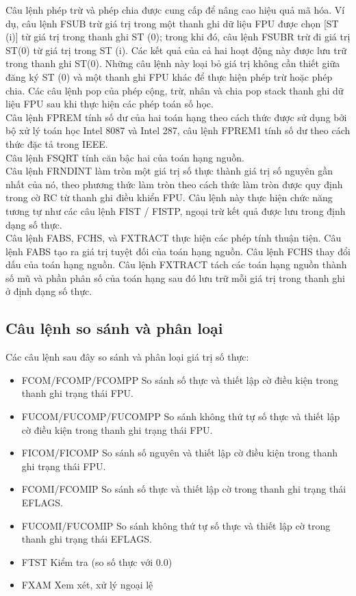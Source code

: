 		Câu lệnh phép trừ và phép chia được cung cấp để nâng cao hiệu quả mã hóa. Ví dụ, câu lệnh FSUB trừ giá trị trong một thanh ghi dữ liệu FPU được chọn [ST (i)] từ giá trị trong thanh ghi ST (0); trong khi đó, câu lệnh FSUBR trừ đi giá trị ST(0) từ giá trị trong ST (i). Các kết quả của cả hai hoạt động này được lưu trữ trong thanh ghi ST(0). Những câu lệnh này loại bỏ giá trị không cần thiết giữa đăng ký ST (0) và một thanh ghi FPU khác để thực hiện phép trừ hoặc phép chia.
Các câu lệnh pop của phép cộng, trừ, nhân và chia pop stack thanh ghi dữ liệu FPU sau khi thực hiện các phép toán số học.\\

		Câu lệnh FPREM tính số dư của hai toán hạng theo cách thức được sử dụng bởi bộ xử lý toán học Intel 8087 và Intel 287, câu lệnh FPREM1 tính số dư theo cách thức đặc tả trong IEEE.\\
		
		Câu lệnh FSQRT tính căn bậc hai của toán hạng nguồn.\\
		
		Câu lệnh FRNDINT làm tròn một giá trị số thực thành giá trị số nguyên gần nhất của nó, theo phương thức làm tròn theo cách thức làm tròn được quy định trong cờ RC từ thanh ghi điều khiển FPU. Câu lệnh này thực hiện chức năng tương tự như các câu lệnh FIST / FISTP, ngoại trừ kết quả được lưu trong định dạng số thực.\\
		
		Câu lệnh FABS, FCHS, và FXTRACT thực hiện các phép tính thuận tiện. Câu lệnh FABS tạo ra giá trị tuyệt đối của toán hạng nguồn. Câu lệnh FCHS thay đổi dấu của toán hạng nguồn. Câu lệnh FXTRACT tách các toán hạng nguồn thành số mũ và phần phân số của toán hạng sau đó lưu trữ mỗi giá trị trong thanh ghi ở định dạng số thực.
		
 		\subsection*{Câu lệnh so sánh và phân loại} 
		Các câu lệnh sau đây so sánh và phân loại giá trị số thực:
		\begin{itemize}
			\renewcommand{\labelitemi}{}
			\item	FCOM/FCOMP/FCOMPP So sánh số thực và thiết lập cờ điều kiện trong thanh ghi trạng thái FPU.
			\item	FUCOM/FUCOMP/FUCOMPP  So sánh không thứ tự số thực và thiết lập cờ điều kiện trong thanh ghi trạng thái FPU.
			\item	FICOM/FICOMP  So sánh số nguyên và thiết lập cờ điều kiện trong thanh ghi trạng thái FPU.
			\item	FCOMI/FCOMIP  So sánh số thực và thiết lập cờ trong thanh ghi trạng thái EFLAGS.
			\item	FUCOMI/FUCOMIP So sánh  không thứ tự số thực và thiết lập cờ trong thanh ghi trạng thái EFLAGS.
			\item	FTST Kiểm tra (so số thực với 0.0)
			\item	FXAM Xem xét, xử lý ngoại lệ
		\end{itemize}

